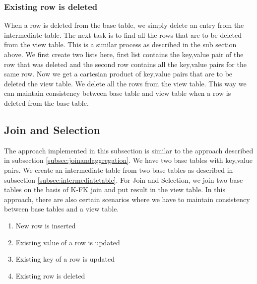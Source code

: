 \documentclass[11pt,a4paper,bibtotoc,idxtotoc,headsepline,footsepline,footexclude,BCOR12mm,DIV13]{scrbook}
\begin{document}
\subsubsection{Existing row is deleted}

When a row is deleted from the base table, we simply delete an entry from the intermediate table. The next task is to find all the rows that are to be deleted from the view table. This is a similar process as described in the sub section above. We first create two lists here, first list contains the key,value pair of the row that was deleted and the second row contains all the key,value pairs for the same row. Now we get a cartesian product of key,value pairs that are to be deleted the view table. We delete all the rows from the view table. This way we can maintain consistency between base table and view table when a row is deleted from the base table.

\subsection{Join and Selection}
\label{subsec:joinandselection}

The approach implemented in this subsection is similar to the approach described in subsection \ref{subsec:joinandaggregation}. We have two base tables with key,value pairs. We create an intermediate table from two base tables as described in subsection \ref{subsec:intermediatetable}. For Join and Selection, we join two base tables on the basis of K-FK join and put result in the view table. In this approach, there are also certain scenarios where we have to maintain consistency between base tables and a view table.

\begin{enumerate}
	\item New row is inserted
	\item Existing value of a row is updated
	\item Existing key of a row is updated
	\item Existing row is deleted
\end{enumerate}
\end{document}
